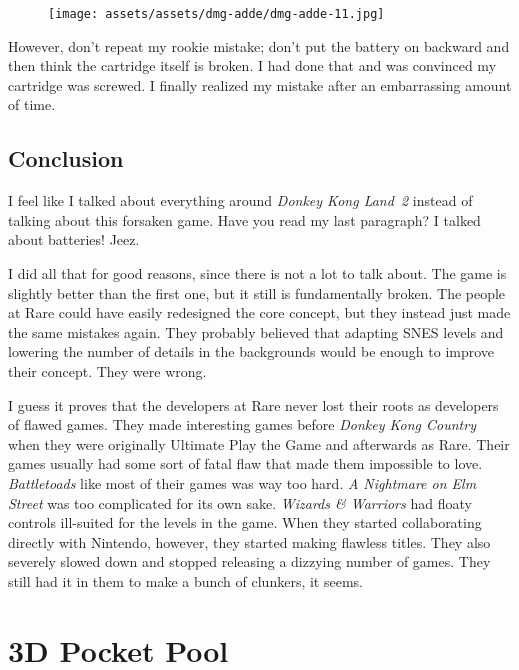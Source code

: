 \documentclass{book}
\begin{document}
\begin{figure}[hbt]
\vskip 10pt
\centering \texttt{[image: assets/assets/dmg-adde/dmg-adde-11.jpg]}
\vskip 6pt
\end{figure}
However, don’t repeat my rookie mistake; don’t put the battery on backward and then think the cartridge itself is broken. I had done that and was convinced my cartridge was screwed. I finally realized my mistake after an embarrassing amount of time.

\FloatBarrier\needspace{10mm}\section*{Conclusion}\nopagebreak[4]

I feel like I talked about everything around \emph{Donkey Kong Land 2} instead of talking about this forsaken game. Have you read my last paragraph? I talked about batteries! Jeez.

I did all that for good reasons, since there is not a lot to talk about. The game is slightly better than the first one, but it still is fundamentally broken. The people at Rare could have easily redesigned the core concept, but they instead just made the same mistakes again. They probably believed that adapting SNES levels and lowering the number of details in the backgrounds would be enough to improve their concept. They were wrong.

I guess it proves that the developers at Rare never lost their roots as developers of flawed games. They made interesting games before \emph{Donkey Kong Country} when they were originally Ultimate Play the Game and afterwards as Rare. Their games usually had some sort of fatal flaw that made them impossible to love. \emph{Battletoads} like most of their games was way too hard. \emph{A Nightmare on Elm Street} was too complicated for its own sake. \emph{Wizards \& Warriors} had floaty controls ill-suited for the levels in the game. When they started collaborating directly with Nintendo, however, they started making flawless titles. They also severely slowed down and stopped releasing a dizzying number of games. They still had it in them to make a bunch of clunkers, it seems.


\begingroup \chapter*{3D Pocket Pool} \endgroup
\end{document}
